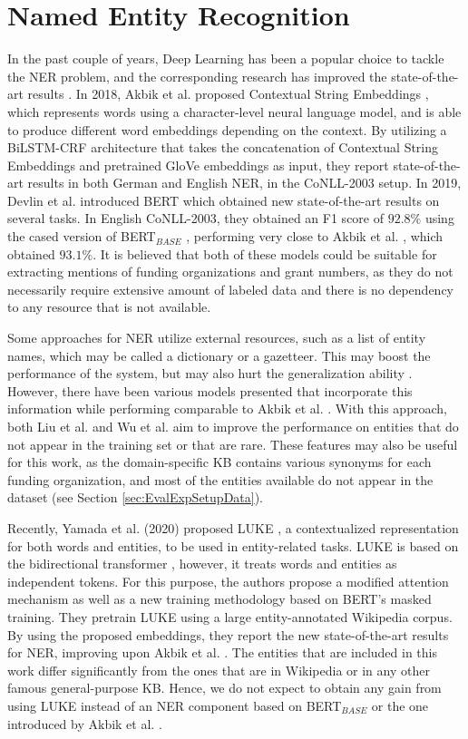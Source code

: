 \documentclass{report}
\theoremstyle{definition}
\theoremstyle{remark}
\begin{document}
\section{Named Entity Recognition}
\label{sota1}
In the past couple of years, Deep Learning has been a popular choice to tackle the NER problem, and the corresponding research has improved the state-of-the-art results \cite{NERsurvey}. In 2018, Akbik et al. proposed Contextual String Embeddings \cite{flairpaper}, which represents words using a character-level neural language model, and is able to produce different word embeddings depending on the context. By utilizing a BiLSTM-CRF architecture that takes the concatenation of Contextual String Embeddings and pretrained GloVe embeddings \cite{glove} as input, they report state-of-the-art results in both German and English NER, in the CoNLL-2003 \cite{conll} setup. In 2019, Devlin et al. introduced BERT \cite{BERT} which obtained new state-of-the-art results on several tasks. In English CoNLL-2003, they obtained an F1 score of $92.8\%$ using the cased version of BERT$_{BASE}$ \cite{BERT}, performing very close to Akbik et al. \cite{flairpaper}, which obtained $93.1\%$. It is believed that both of these models could be suitable for extracting mentions of funding organizations and grant numbers, as they do not necessarily require extensive amount of labeled data and there is no dependency to any resource that is not available.

Some approaches for NER utilize external resources, such as a list of entity names, which may be called a dictionary or a gazetteer. This may boost the performance of the system, but may also hurt the generalization ability \cite{NERsurvey}. However, there have been various models presented \cite{NERgazetteer, NERDict} that incorporate this information while performing comparable to Akbik et al. \cite{flairpaper}. With this approach, both Liu et al. \cite{NERgazetteer} and Wu et al. \cite{ NERDict} aim to improve the performance on entities that do not appear in the training set or that are rare. These features may also be useful for this work, as the domain-specific KB contains various synonyms for each funding organization, and most of the entities available do not appear in the dataset (see Section \ref{sec:EvalExpSetupData}).

Recently, Yamada et al. (2020) proposed LUKE \cite{LUKE}, a contextualized representation for both words and entities, to be used in entity-related tasks. LUKE is based on the bidirectional transformer \cite{transformer}, however, it treats words and entities as independent tokens. For this purpose, the authors propose a modified attention mechanism as well as a new training methodology based on BERT's masked training. They pretrain LUKE using a large entity-annotated Wikipedia corpus. By using the proposed embeddings, they report the new state-of-the-art results for NER, improving upon Akbik et al. \cite{flairpaper}. The entities that are included in this work differ significantly from the ones that are in Wikipedia or in any other famous general-purpose KB. Hence, we do not expect to obtain any gain from using LUKE instead of an NER component based on BERT$_{BASE}$ or the one introduced by Akbik et al. \cite{flairpaper}.
\end{document}
